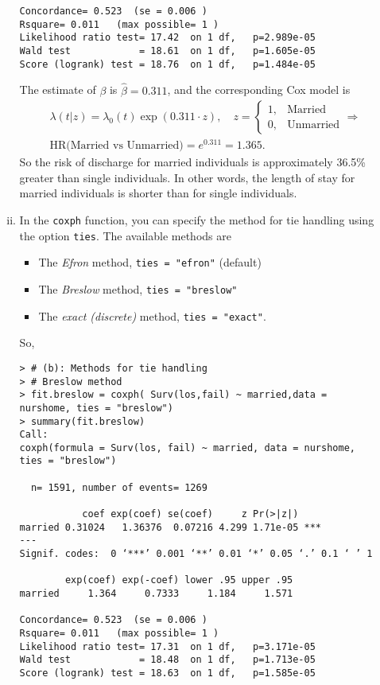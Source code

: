 \begin{enumerate}[(a)]
\begin{enumerate}[(i)]
\begin{footnotesize}
\begin{verbatim}
Concordance= 0.523  (se = 0.006 )
Rsquare= 0.011   (max possible= 1 )
Likelihood ratio test= 17.42  on 1 df,   p=2.989e-05
Wald test            = 18.61  on 1 df,   p=1.605e-05
Score (logrank) test = 18.76  on 1 df,   p=1.484e-05
\end{verbatim}
\end{footnotesize} 
The estimate of $\beta$ is $\hat{\beta} = 0.311$, and the corresponding Cox model is
\begin{align}
&\lambda(t|z) = \lambda_{0}(t)\exp(0.311\cdot z),\quad z = \begin{cases}
1, & \text{Married} \\
0, & \text{Unmarried}
\end{cases} \nonumber 
\Rightarrow \nonumber \\
&\text{HR(Married vs Unmarried)}=e^{0.311} = 1.365. \nonumber
\end{align}
So the risk of discharge for married individuals is approximately 36.5\% greater than 
single individuals. In other words, the length of stay for married individuals is 
shorter than for single individuals.
\item In the \verb|coxph| function, you can specify the method for tie handling using the option \verb|ties|. The available methods are 
\begin{itemize}
\item The \emph{Efron} method, \verb|ties = "efron"| (default) 
\item The \emph{Breslow} method, \verb|ties = "breslow"| 
\item The \emph{exact (discrete)} method, \verb|ties = "exact"|.
\end{itemize}
So,
\begin{footnotesize}
\begin{verbatim}
> # (b): Methods for tie handling
> # Breslow method
> fit.breslow = coxph( Surv(los,fail) ~ married,data = nurshome, ties = "breslow")
> summary(fit.breslow)
Call:
coxph(formula = Surv(los, fail) ~ married, data = nurshome, ties = "breslow")

  n= 1591, number of events= 1269 

           coef exp(coef) se(coef)     z Pr(>|z|)    
married 0.31024   1.36376  0.07216 4.299 1.71e-05 ***
---
Signif. codes:  0 ‘***’ 0.001 ‘**’ 0.01 ‘*’ 0.05 ‘.’ 0.1 ‘ ’ 1

        exp(coef) exp(-coef) lower .95 upper .95
married     1.364     0.7333     1.184     1.571

Concordance= 0.523  (se = 0.006 )
Rsquare= 0.011   (max possible= 1 )
Likelihood ratio test= 17.31  on 1 df,   p=3.171e-05
Wald test            = 18.48  on 1 df,   p=1.713e-05
Score (logrank) test = 18.63  on 1 df,   p=1.585e-05


\end{verbatim}
\end{footnotesize}
\end{enumerate}
\end{enumerate}
